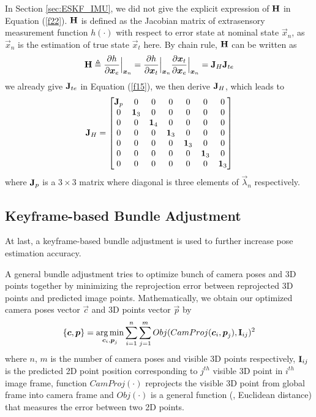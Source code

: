 In Section \ref{sec:ESKF_IMU}, we did not give the explicit expression of $\mathbf{H}$ in Equation (\ref{f22}). $\mathbf{H}$ is defined as the Jacobian matrix of extrasensory measurement function $h(\cdot)$ with respect to error state at nominal state $\vec{x}_n$, as $\vec{x}_n$ is the estimation of true state $\vec{x}_t$ here. By chain rule, $\mathbf{H}$ can be written as
\begin{equation}
	\mathbf{H} \triangleq \frac{\partial{h}}{\partial{\boldsymbol{x}_e}}\Bigr|_{\boldsymbol{x}_n} = \frac{\partial{h}}{\partial{\boldsymbol{x}_t}}\Bigr|_{\boldsymbol{x}_n}\frac{\partial{\boldsymbol{x}_t}}{\partial{\boldsymbol{x}_e}}\Bigr|_{\boldsymbol{x}_n} = \mathbf{J}_H\mathbf{J}_{t e}
\end{equation}
we already give $\mathbf{J}_{t e}$ in Equation (\ref{f15}), we then derive $\mathbf{J}_H$, which leads to
\begin{equation}
	\mathbf{J}_H = \begin{bmatrix}
	\mathbf{J}_p & 0 & 0 & 0 & 0 & 0 & 0\\
	0 & \mathbf{1}_3 &0 & 0 & 0 & 0 & 0\\
	0 & 0 & \mathbf{1}_4 & 0 & 0 & 0 & 0\\
	0 & 0 & 0 & \mathbf{1}_3 & 0 & 0 & 0\\
	0 & 0 & 0 & 0 & \mathbf{1}_3 & 0 & 0\\
	0 & 0 & 0 & 0 & 0 & \mathbf{1}_3 & 0\\
	0 & 0 & 0 & 0 & 0 & 0 & \mathbf{1}_3 \\
	\end{bmatrix}
\end{equation}
where $\mathbf{J}_p$ is a $3 \times 3$ matrix where diagonal is three elements of $\vec{\lambda}_n$ respectively.

\subsection{Keyframe-based Bundle Adjustment}
\label{subsec:camera_comple_data_sub3}

At last, a keyframe-based bundle adjustment is used to further increase pose estimation accuracy.

A general bundle adjustment tries to optimize bunch of camera poses and 3D points together by minimizing the reprojection error between reprojected 3D points and predicted image points. Mathematically, we obtain our optimized camera poses vector $\vec{c}$ and 3D points vector $\vec{p}$ by
\begin{equation}\label{c1}
	\{ \boldsymbol{c}, \boldsymbol{p} \} = \mathop{\rm arg\,min}\limits_{\boldsymbol{c}_i, \boldsymbol{p}_j} \sum_{i=1}^n \sum_{j=1}^m Obj(CamProj(\boldsymbol{c}_i, \boldsymbol{p}_j), \mathbf{I}_{ij})^2
\end{equation}
where $n$, $m$ is the number of camera poses and visible 3D points respectively, $\mathbf{I}_{ij}$ is the predicted 2D point position corresponding to $j^{th}$ visible 3D point in $i^{th}$ image frame, function $CamProj(\cdot)$ reprojects the visible 3D point from global frame into camera frame and $Obj(\cdot)$ is a general function (\eg, Euclidean distance) that measures the error between two 2D points.

